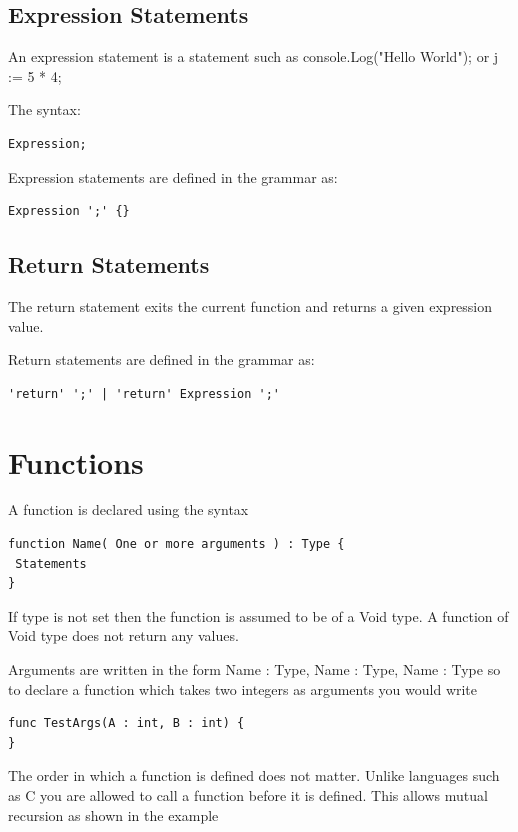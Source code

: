 \documentclass[]{final_report}
\begin{document}
\subsection{Expression Statements}

An expression statement is a statement such as console.Log("Hello World"); or j := 5 * 4;

The syntax: \begin{verbatim}Expression;\end{verbatim}

Expression statements are defined in the grammar as:
\begin{verbatim}
Expression ';' {}
\end{verbatim}

\subsection{Return Statements}

The return statement exits the current function and returns a given expression value. 

Return statements are defined in the grammar as:
\begin{verbatim}
'return' ';' | 'return' Expression ';'
\end{verbatim}

\section{Functions}

A function is declared using the syntax

\begin{verbatim}
function Name( One or more arguments ) : Type {
 Statements
}
\end{verbatim}

If type is not set then the function is assumed to be of a Void type. A function of Void type does not return any values.

Arguments are written in the form Name : Type, Name : Type, Name : Type so to declare a function which takes two integers as arguments you would write

\begin{verbatim}
func TestArgs(A : int, B : int) {
}
\end{verbatim}
The order in which a function is defined does not matter. Unlike languages such as C you are allowed to call a function before it is defined. This allows mutual recursion as shown in the example
\end{document}
